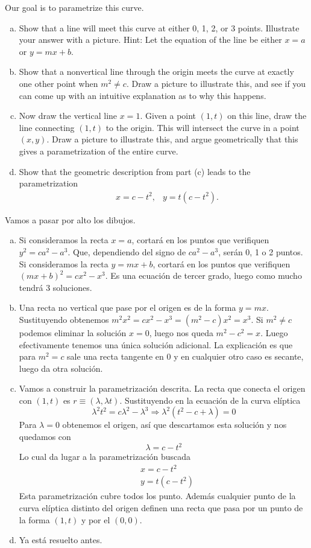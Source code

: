 \documentclass[twoside]{article}
\begin{document}
Our goal is to parametrize this curve.
\begin{enumerate}[a.]
\item Show that a line will meet this curve at either 0, 1, 2, or 3 points. Illustrate your answer
with a picture. Hint: Let the equation of the line be either $x = a$ or $y = mx + b$.
\item Show that a nonvertical line through the origin meets the curve at exactly one other
point when $m^2 \neq c$. Draw a picture to illustrate this, and see if you can come up with
an intuitive explanation as to why this happens.
\item Now draw the vertical line $x = 1$. Given a point $(1, t)$ on this line, draw the line
connecting $(1, t)$ to the origin. This will intersect the curve in a point $(x, y)$. Draw a
picture to illustrate this, and argue geometrically that this gives a parametrization of
the entire curve.
\item Show that the geometric description from part (c) leads to the parametrization
\begin{align*}
&x = c − t^2,
&y = t(c − t^2).
\end{align*}
\end{enumerate}
\begin{solucion}
Vamos a pasar por alto los dibujos. 
\begin{enumerate}[a.]
\item Si consideramos la recta $x=a$, cortará en los puntos que verifiquen $y^2=ca^2-a^3$. Que, dependiendo del signo de $ca^2-a^3$, serán 0, 1 o 2 puntos.  Si consideramos la recta $y=mx+b$, cortará en los puntos que verifiquen $(mx+b)^2=cx^2-x^3$. Es una ecuación de tercer grado, luego como mucho tendrá 3 soluciones.
\item Una recta no vertical que pase por el origen es de la forma $y=mx$. Sustituyendo obtenemos $m^2x^2=cx^2-x^3=(m^2-c)x^2=x^3$. Si $m^2\neq c$ podemos eliminar la solución $x=0$, luego nos queda $m^2-c^2=x$. Luego efectivamente tenemos una única solución adicional. La explicación es que para $m^2=c$ sale una recta tangente en 0 y en cualquier otro caso es secante, luego da otra solución. 
\item Vamos a construir la parametrización descrita. La recta que conecta el origen con $(1,t)$ es $r\equiv (\lambda, \lambda t)$. Sustituyendo en la ecuación de la curva elíptica
\[
\lambda^2t^2=c\lambda^2-\lambda^3\Rightarrow \lambda^2(t^2-c+\lambda)=0
\]
Para $\lambda=0$ obtenemos el origen, así que descartamos esta solución y nos quedamos con
\[
\lambda=c-t^2
\]
Lo cual da lugar a la parametrización buscada
\begin{align*}
&x= c-t^2\\
&y=t(c-t^2)
\end{align*}
Esta parametrización cubre todos los punto. Además cualquier punto de la curva elíptica distinto del origen definen una recta que pasa por un punto de la forma $(1,t)$ y por el $(0,0)$. 
\item Ya está resuelto antes.
\end{enumerate}
\end{solucion}
\end{document}
